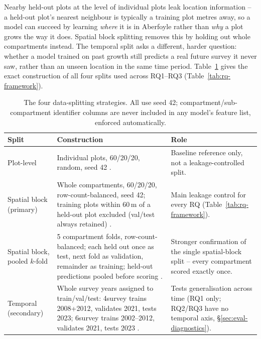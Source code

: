 
Nearby held-out plots at the level of individual plots leak location information -- a held-out plot's nearest neighbour is typically a training plot metres away, so a model can succeed by learning \emph{where} it is in Aberfoyle rather than \emph{why} a plot grows the way it does. Spatial block splitting removes this by holding out whole compartments instead. The temporal split asks a different, harder question: whether a model trained on past growth still predicts a real future survey it never saw, rather than an unseen location in the same time period. Table~\ref{tab:splits-summary} gives the exact construction of all four splits used across RQ1--RQ3 (Table~\ref{tab:rq-framework}).

\begin{table}[!htbp]
\centering
\scriptsize
\renewcommand{\arraystretch}{1.2}
\begin{tabular}{p{2.1cm}p{5.1cm}p{5.3cm}}
\toprule
Split & Construction & Role \\
\midrule
Plot-level & Individual plots, 60/20/20, random, seed 42 \ct{source that uses plot-level split}. & Baseline reference only, not a leakage-controlled split. \\
Spatial block (primary) & Whole compartments, 60/20/20, row-count-balanced, seed 42; training plots within 60\,m of a held-out plot excluded (val/test always retained) \citep{roberts2017Cross_C5_EVAL}. & Main leakage control for every RQ (Table~\ref{tab:rq-framework}). \\
Spatial block, pooled $k$-fold & 5 compartment folds, row-count-balanced; each held out once as test, next fold as validation, remainder as training; held-out predictions pooled before scoring \citep{ploton2020Spatial_C5_EVAL}. & Stronger confirmation of the single spatial-block split -- every compartment scored exactly once. \\
Temporal (secondary) & Whole survey years assigned to train/val/test: 4survey trains 2008+2012, validates 2021, tests 2023; 6survey trains 2002--2012, validates 2021, tests 2023 \citep{lynch2025Digital_C4_NN}. & Tests generalisation across time (RQ1 only; RQ2/RQ3 have no temporal axis, \S\ref{sec:eval-diagnostics}). \\
\bottomrule
\end{tabular}
\caption{The four data-splitting strategies. All use seed 42; compartment/sub-compartment
identifier columns are never included in any model's feature list, enforced automatically.}
\label{tab:splits-summary}
\end{table}

